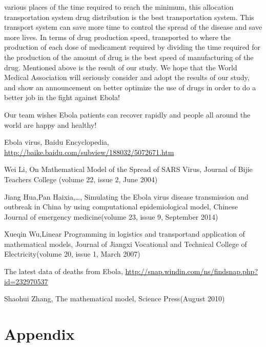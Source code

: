 \documentclass{icmmcm}
\begin{document}
various places of the time required to reach the minimum, this
allocation transportation system drug distribution is the best
transportation system. This transport system can save more time
to control the spread of the disease and save more lives. In
terms of drug production speed, transported to where the
production of each dose of medicament required by dividing the
time required for the production of the amount of drug is the
best speed of manufacturing of the drug. Mentioned above is the
result of our study. We hope that the World Medical Association
will seriously consider and adopt the results of our study, and
show an announcement on better optimize the use of drugs in
order to do a better job in the fight against Ebola!
\par Our team wishes Ebola patients can recover rapidly and
people all around the world are happy and healthy!\\\nline%


\begin{thebibliography}{10}
Ebola virus, Baidu Encyclopedia,
  \url{http://baike.baidu.com/subview/188032/5072671.htm}

Wei Li, On Mathematical Model of the Spread of
  SARS Virus, Journal of Bijie Teachers College (volume 22,
  issue 2, June 2004)

Jiang Hua,Pan Haixia,\ldots, Simulating the Ebola
virus disease transmission and outbreak in China by using computational
epidemiological model, Chinese Journal of emergency
medicine(volume 23, issue 9, September 2014)

Xueqin Wu,Linear Programming in logistics and
transportand application of mathematical models, Journal of
Jiangxi Vocational and Technical College of Electricity(volume
20, issue 1, March 2007)

The latest data of deaths from Ebola,
\url{http://snap.windin.com/ns/findsnap.php?id=232970537}

Shaohui Zhang, The mathematical model, Science
Press(August 2010)
\end{thebibliography}

\section*{Appendix}

\end{document}
